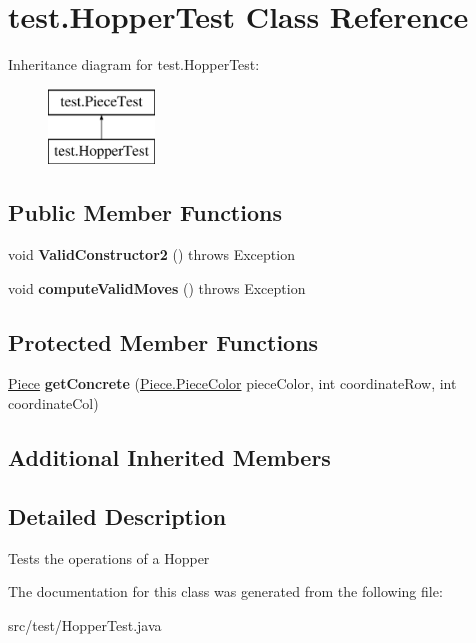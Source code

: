 \hypertarget{classtest_1_1_hopper_test}{}\section{test.\+Hopper\+Test Class Reference}
\label{classtest_1_1_hopper_test}
Inheritance diagram for test.\+Hopper\+Test\+:\begin{figure}[H]
\begin{center}
\leavevmode
\includegraphics[height=2.000000cm]{classtest_1_1_hopper_test}
\end{center}
\end{figure}
\subsection*{Public Member Functions}
\begin{DoxyCompactItemize}
\item 
\mbox{\label{classtest_1_1_hopper_test_aab1273edd7c8652a55cbdfef6ad631fc}} 
void {\bfseries Valid\+Constructor2} ()  throws Exception 
\item 
\mbox{\label{classtest_1_1_hopper_test_a84532a3a46f32720dc4f69c1f1fc0dc3}} 
void {\bfseries compute\+Valid\+Moves} ()  throws Exception 
\end{DoxyCompactItemize}
\subsection*{Protected Member Functions}
\begin{DoxyCompactItemize}
\item 
\mbox{\label{classtest_1_1_hopper_test_a9d26c802a5dc723cfc67ee6d1b5652e3}} 
\mbox{\hyperlink{classpieces_1_1_piece}{Piece}} {\bfseries get\+Concrete} (\mbox{\hyperlink{enumpieces_1_1_piece_1_1_piece_color}{Piece.\+Piece\+Color}} piece\+Color, int coordinate\+Row, int coordinate\+Col)
\end{DoxyCompactItemize}
\subsection*{Additional Inherited Members}


\subsection{Detailed Description}
Tests the operations of a Hopper 

The documentation for this class was generated from the following file\+:\begin{DoxyCompactItemize}
\item 
src/test/Hopper\+Test.\+java\end{DoxyCompactItemize}
